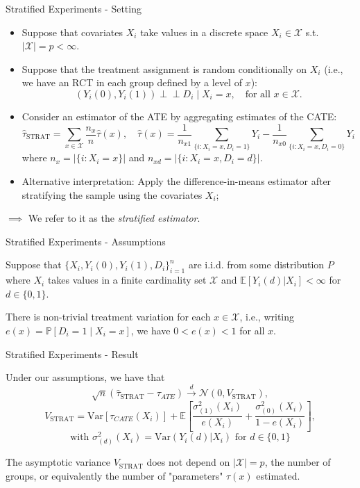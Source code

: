 \documentclass[11pt,aspectratio=169]{beamer}
\begin{document}
\begin{frame}{Stratified Experiments - Setting}

\begin{itemize}
    \item Suppose that covariates $X_i$ take values in a discrete space $X_i \in \mathcal{X}$ s.t. $|\mathcal{X}| = p < \infty$.
    \item Suppose that the treatment assignment is random conditionally on $X_i$ (i.e., we have an RCT in each group defined by a level of $x$):
    $$(Y_i(0), Y_i(1)) \perp\!\!\!\perp D_i \mid X_i = x, \quad \text{for all } x \in \mathcal{X}.$$
    \item Consider an estimator of the ATE by aggregating estimates of the CATE:
    $$\widehat{\tau}_{\text{STRAT}} = \sum_{x \in \mathcal{X}} \frac{n_x}{n} \widehat{\tau}(x), \quad \widehat{\tau}(x) = \frac{1}{n_{x1}} \sum_{\{i : X_i = x, D_i = 1\}} Y_i - \frac{1}{n_{x0}} \sum_{\{i : X_i = x, D_i = 0\}} Y_i$$
    where $n_x = |\{i : X_i = x\}|$ and $n_{xd} = |\{i : X_i = x, D_i = d\}|$.
    \item Alternative interpretation: Apply the difference-in-means estimator after stratifying the sample using the covariates $X_i$;
\end{itemize}

$\implies$ We refer to it as the \emph{stratified estimator}.
\end{frame}


\begin{frame}{Stratified Experiments - Assumptions}

\begin{definitionbox}
Suppose that $\{X_i, Y_i(0), Y_i(1), D_i\}_{i=1}^n$ are i.i.d. from some distribution $P$ where $X_i$ takes values in a finite cardinality set $\mathcal{X}$ and $\mathbb{E}[Y_i(d)|X_i] < \infty$ for $d \in \{0, 1\}$.
\end{definitionbox}
\begin{definitionbox}
There is non-trivial treatment variation for each $x \in \mathcal{X}$, i.e., writing $e(x) = \mathbb{P}[D_i = 1 \mid X_i = x]$, we have $0 < e(x) < 1$ for all $x$.
\end{definitionbox}
\end{frame}

\begin{frame}{Stratified Experiments - Result}
\begin{theorembox}
Under our assumptions, we have that
$$\sqrt{n}(\widehat{\tau}_{\text{STRAT}} - \tau_{ATE}) \xrightarrow{d} \mathcal{N}(0, V_{\text{STRAT}}),$$
$$V_{\text{STRAT}} = \text{Var}[\tau_{CATE}(X_i)] + \mathbb{E}\left[\frac{\sigma_{(1)}^2(X_i)}{e(X_i)} + \frac{\sigma_{(0)}^2(X_i)}{1 - e(X_i)}\right],$$
$$\text{with } \sigma_{(d)}^2(X_i) = \text{Var}(Y_i(d)|X_i) \text{ for } d \in \{0, 1\}$$
\end{theorembox}
The asymptotic variance $V_{\text{STRAT}}$ does not depend on $|\mathcal{X}| = p$, the number of groups, or equivalently the number of "parameters" $\tau(x)$ estimated.
\end{frame}
\end{document}
